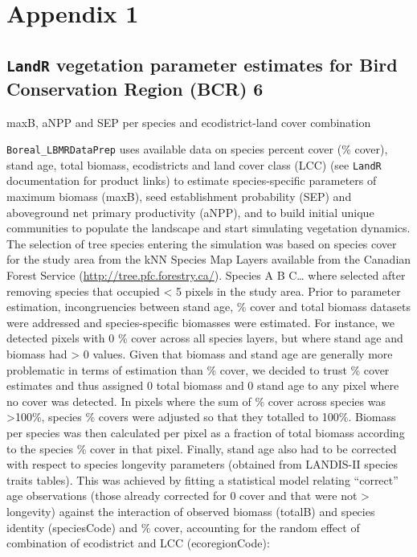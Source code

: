 \documentclass[]{article}
\begin{document}
\section{Appendix 1}\label{appendix-1}

\subsection{\texorpdfstring{\texttt{LandR} vegetation parameter
estimates for Bird Conservation Region (BCR)
6}{LandR vegetation parameter estimates for Bird Conservation Region (BCR) 6}}\label{landr-vegetation-parameter-estimates-for-bird-conservation-region-bcr-6}

maxB, aNPP and SEP per species and ecodistrict-land cover combination

\texttt{Boreal\_LBMRDataPrep} uses available data on species percent
cover (\% cover), stand age, total biomass, ecodistricts and land cover
class (LCC) (see \texttt{LandR} documentation for product links) to
estimate species-specific parameters of maximum biomass (maxB), seed
establishment probability (SEP) and aboveground net primary productivity
(aNPP), and to build initial unique communities to populate the
landscape and start simulating vegetation dynamics. The selection of
tree species entering the simulation was based on species cover for the
study area from the kNN Species Map Layers available from the Canadian
Forest Service (\url{http://tree.pfc.forestry.ca/}). Species A B
C\ldots{} where selected after removing species that occupied
\textless{} 5 pixels in the study area. Prior to parameter estimation,
incongruencies between stand age, \% cover and total biomass datasets
were addressed and species-specific biomasses were estimated. For
instance, we detected pixels with 0 \% cover across all species layers,
but where stand age and biomass had \textgreater{} 0 values. Given that
biomass and stand age are generally more problematic in terms of
estimation than \% cover, we decided to trust \% cover estimates and
thus assigned 0 total biomass and 0 stand age to any pixel where no
cover was detected. In pixels where the sum of \% cover across species
was \textgreater{}100\%, species \% covers were adjusted so that they
totalled to 100\%. Biomass per species was then calculated per pixel as
a fraction of total biomass according to the species \% cover in that
pixel. Finally, stand age also had to be corrected with respect to
species longevity parameters (obtained from LANDIS-II species traits
tables). This was achieved by fitting a statistical model relating
``correct'' age observations (those already corrected for 0 cover and
that were not \textgreater{} longevity) against the interaction of
observed biomass (totalB) and species identity (speciesCode) and \%
cover, accounting for the random effect of combination of ecodistrict
and LCC (ecoregionCode):
\end{document}
